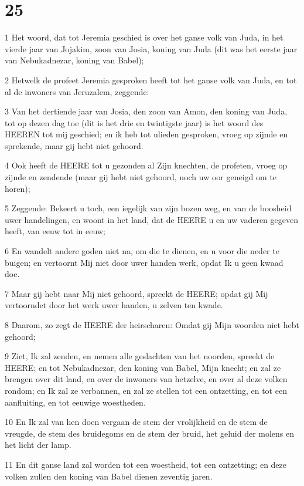 \chapter{25}

\par 1 Het woord, dat tot Jeremia geschied is over het ganse volk van Juda, in het vierde jaar van Jojakim, zoon van Josia, koning van Juda (dit was het eerste jaar van Nebukadnezar, koning van Babel);
\par 2 Hetwelk de profeet Jeremia gesproken heeft tot het ganse volk van Juda, en tot al de inwoners van Jeruzalem, zeggende:
\par 3 Van het dertiende jaar van Josia, den zoon van Amon, den koning van Juda, tot op dezen dag toe (dit is het drie en twintigste jaar) is het woord des HEEREN tot mij geschied; en ik heb tot ulieden gesproken, vroeg op zijnde en sprekende, maar gij hebt niet gehoord.
\par 4 Ook heeft de HEERE tot u gezonden al Zijn knechten, de profeten, vroeg op zijnde en zendende (maar gij hebt niet gehoord, noch uw oor geneigd om te horen);
\par 5 Zeggende: Bekeert u toch, een iegelijk van zijn bozen weg, en van de boosheid uwer handelingen, en woont in het land, dat de HEERE u en uw vaderen gegeven heeft, van eeuw tot in eeuw;
\par 6 En wandelt andere goden niet na, om die te dienen, en u voor die neder te buigen; en vertoornt Mij niet door uwer handen werk, opdat Ik u geen kwaad doe.
\par 7 Maar gij hebt naar Mij niet gehoord, spreekt de HEERE; opdat gij Mij vertoorndet door het werk uwer handen, u zelven ten kwade.
\par 8 Daarom, zo zegt de HEERE der heirscharen: Omdat gij Mijn woorden niet hebt gehoord;
\par 9 Ziet, Ik zal zenden, en nemen alle geslachten van het noorden, spreekt de HEERE; en tot Nebukadnezar, den koning van Babel, Mijn knecht; en zal ze brengen over dit land, en over de inwoners van hetzelve, en over al deze volken rondom; en Ik zal ze verbannen, en zal ze stellen tot een ontzetting, en tot een aanfluiting, en tot eeuwige woestheden.
\par 10 En Ik zal van hen doen vergaan de stem der vrolijkheid en de stem de vreugde, de stem des bruidegoms en de stem der bruid, het geluid der molens en het licht der lamp.
\par 11 En dit ganse land zal worden tot een woestheid, tot een ontzetting; en deze volken zullen den koning van Babel dienen zeventig jaren.
